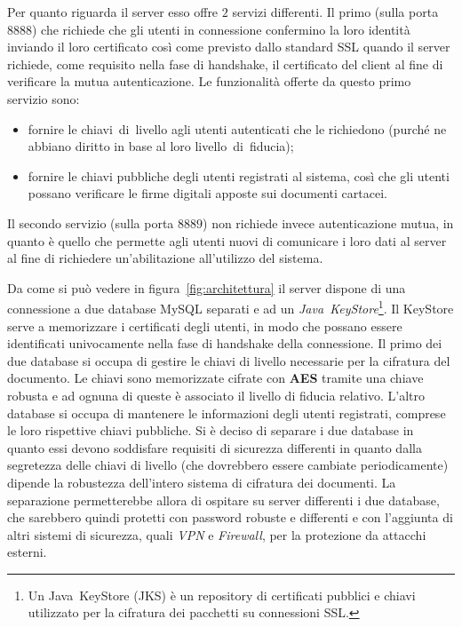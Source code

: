 Per quanto riguarda il server esso offre $2$ servizi differenti. Il primo (sulla porta $8888$) che richiede che gli utenti in connessione confermino la loro identità inviando il loro certificato così come previsto dallo standard SSL quando il server richiede, come requisito nella fase di handshake, il certificato del client al fine di verificare la mutua autenticazione.
Le funzionalità offerte da questo primo servizio sono:
\begin{itemize}
	\item fornire le chiavi~di~livello agli utenti autenticati che le richiedono (purché ne abbiano diritto in base al loro livello~di~fiducia);
	\item fornire le chiavi pubbliche degli utenti registrati al sistema, così che gli utenti possano verificare le firme digitali apposte sui documenti cartacei.
\end{itemize}
Il secondo servizio (sulla porta $8889$) non richiede invece autenticazione mutua, in quanto è quello che permette agli utenti nuovi di comunicare i loro dati al server al fine di richiedere un'abilitazione all'utilizzo del sistema.

Da come si può vedere in figura~\ref{fig:architettura} il server dispone di una connessione a due database MySQL separati e ad un \emph{Java~KeyStore}\footnote{Un Java~KeyStore (JKS) è un repository di certificati pubblici e chiavi utilizzato per la cifratura dei pacchetti su connessioni SSL.}. 
Il KeyStore serve a memorizzare i certificati degli utenti, in modo che possano essere identificati univocamente nella fase di handshake della connessione.
Il primo dei due database si occupa di gestire le chiavi di livello necessarie per la cifratura del documento. Le chiavi sono memorizzate cifrate con \textbf{AES} tramite una chiave robusta e ad ognuna di queste è associato il livello di fiducia relativo. L'altro database si occupa di mantenere le informazioni degli utenti registrati, comprese le loro rispettive chiavi pubbliche. Si è deciso di separare i due database in quanto essi devono soddisfare requisiti di sicurezza differenti in quanto dalla segretezza delle chiavi di livello (che dovrebbero essere cambiate periodicamente) dipende la robustezza dell'intero sistema di cifratura dei documenti. La separazione permetterebbe allora di ospitare su server differenti i due database, che sarebbero quindi protetti con password robuste e differenti e con l'aggiunta di altri sistemi di sicurezza, quali \emph{VPN} e \emph{Firewall}, per la protezione da attacchi esterni.

